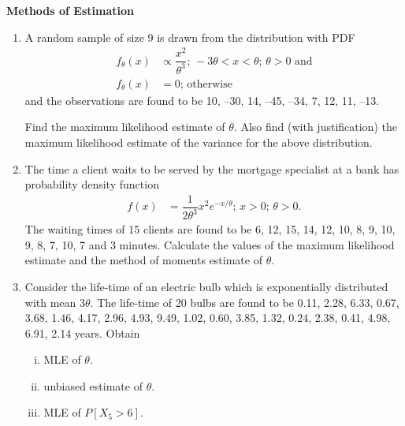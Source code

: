 \documentclass[11pt, a4paper]{article}
\author{}
\date{}
\begin{document}
\begin{center}

\textbf{\huge Methods of Estimation}

\end{center}


\vspace{20pt}

\begin{enumerate}



	\item A random sample of size 9 is drawn from the distribution with PDF
	\begin{align*}
	f_{\theta}(x) &\propto \dfrac{x^2}{{\theta}^3}; \,  -3\theta < x < \theta; \, \theta > 0 \,\, \text{and} \\
	f_{\theta}(x) &= 0; \, \text{otherwise}
	\end{align*}
	and the observations are found to be 10, –30, 14, –45, –34, 7, 12, 11, –13.

Find the maximum likelihood estimate of $\theta$. Also find (with justification) the maximum likelihood estimate of the variance for the above distribution.



\vspace{10pt}


	\item The time a client waits to be served by the mortgage specialist at a bank has probability density function 
	\begin{align*}
	f(x) &= \dfrac{1}{2{\theta}^3} x^2 e^{-x/\theta}; \, x > 0; \, \theta > 0.
	\end{align*}
	The waiting times of 15 clients are found to be 6, 12, 15, 14, 12, 10, 8, 9, 10, 9, 8, 7, 10, 7 and 3 minutes. 
Calculate the values of the maximum likelihood estimate and the method of moments estimate of $\theta$. 





\vspace{10pt}




	\item Consider the life-time of an electric bulb which is exponentially distributed with mean $3\theta$. The life-time of 20 bulbs are found to be 0.11, 2.28, 6.33, 0.67, 3.68, 1.46, 4.17, 2.96, 4.93, 9.49, 1.02, 0.60, 3.85, 1.32, 0.24, 2.38, 0.41, 4.98, 6.91, 2.14 years. Obtain 
	\begin{enumerate}[(i)]
		\item MLE of $\theta$.
		\item unbiased estimate of $\theta$.
		\item MLE of $P\left[ X_5 > 6 \right]$.	
	\end{enumerate}
	

\end{enumerate}
\end{document}
